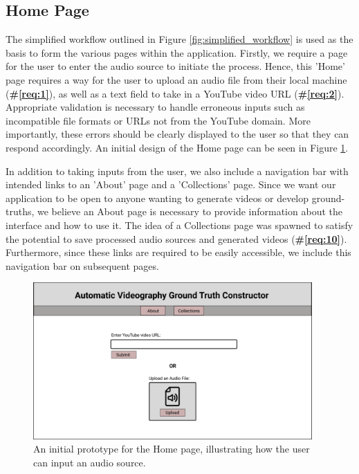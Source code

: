 \documentclass{l4proj}
\begin{document}
\subsection{Home Page}
The simplified workflow outlined in Figure \ref{fig:simplified_workflow} is used as the basis to form the various pages within the application. Firstly, we require a page for the user to enter the audio source to initiate the process. Hence, this 'Home' page requires a way for the user to upload an audio file from their local machine (\textbf{\#\ref{req:1}}), as well as a text field to take in a YouTube video URL (\textbf{\#\ref{req:2}}). Appropriate validation is necessary to handle erroneous inputs such as incompatible file formats or URLs not from the YouTube domain. More importantly, these errors should be clearly displayed to the user so that they can respond accordingly. An initial design of the Home page can be seen in Figure \ref{fig:home_page}. 

In addition to taking inputs from the user, we also include a navigation bar with intended links to an 'About' page and a 'Collections' page. Since we want our application to be open to anyone wanting to generate videos or develop ground-truths, we believe an About page is necessary to provide information about the interface and how to use it. The idea of a Collections page was spawned to satisfy the potential to save processed audio sources and generated videos (\textbf{\#\ref{req:10}}). Furthermore, since these links are required to be easily accessible, we include this navigation bar on subsequent pages.

\begin{figure}
    \centering
    \includegraphics[width=0.95\textwidth]{figures/home_page.pdf}
    \caption{An initial prototype for the Home page, illustrating how the user can input an audio source.}
    \label{fig:home_page}
\end{figure}
\end{document}
